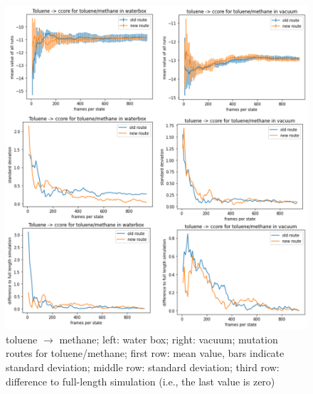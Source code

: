 \begin{figure}[!htb]
	
	\includegraphics[scale=0.9]{toluene_short}\caption{toluene $\mathrm{\rightarrow}$ methane; left: water box; right: vacuum; mutation routes for toluene/methane; first row: mean value, bars indicate standard deviation; middle row: standard deviation; third row: difference to full-length simulation (i.e., the last value is zero)}
		\label{fig:toluene_short}
\end{figure}

